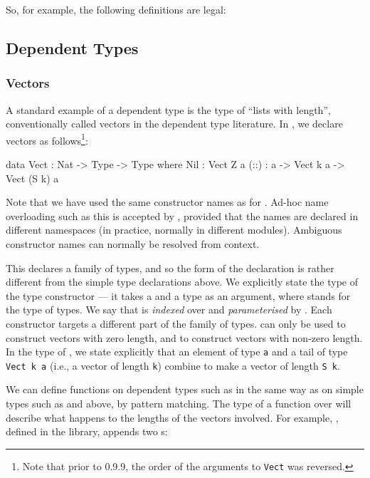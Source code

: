 \noindent
So, for example, the following definitions are legal:


\subsection{Dependent Types}

\subsubsection{Vectors}

A standard example of a dependent type is the type of ``lists with length'', conventionally called vectors in the dependent type literature.
In \Idris{}, we declare vectors as follows\footnote{Note that prior to \Idris{} 0.9.9, the order of the arguments to \texttt{Vect} was reversed.}:

\begin{code}
data Vect : Nat -> Type -> Type where
   Nil  : Vect Z a
   (::) : a -> Vect k a -> Vect (S k) a
\end{code}

\noindent
Note that we have used the same constructor names as for .
Ad-hoc name overloading such as this is accepted by \Idris{}, provided that the names are declared in different namespaces (in practice, normally in different modules).
Ambiguous constructor names can normally be resolved from context.

This declares a family of types, and so the form of the declaration is rather different from the simple type declarations above.
We explicitly state the type of the type constructor  --- it takes a  and a type as an
argument, where  stands for the type of types.
We say that  is \emph{indexed} over  and \emph{parameterised} by .
Each constructor targets a different part of the family of types.  can only be used to construct vectors with zero length, and \tDC{::} to construct vectors with non-zero length.
In the type of \tDC{::}, we state explicitly that an element of type \texttt{a} and a tail of type \texttt{Vect k a} (i.e., a vector of length \texttt{k}) combine to make a vector of length \texttt{S k}.

We can define functions on dependent types such as  in the same way as on simple types such as  and  above, by pattern matching.
The type of a function over  will describe what happens to the lengths of the vectors involved.
For example, \tFN{++}, defined in the library, appends two s:

